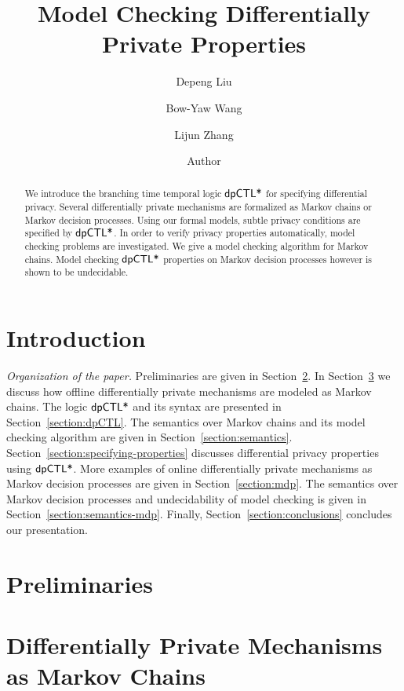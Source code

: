 \documentclass{llncs}
\title{Model Checking Differentially Private Properties}
\author{
Depeng Liu\inst{1}
\and
Bow-Yaw Wang\inst{2}
\and
Lijun Zhang\inst{1}}
\institute{
Chinese Academy of Sciences
\and
Academia Sinica
}
\author{Author}
\institute{Institute}
\begin{document}
\maketitle

\begin{abstract}
  We introduce the branching time temporal logic $\textsf{dpCTL*}$ for
  specifying differential privacy. Several differentially private
  mechanisms are formalized as Markov chains or Markov decision
  processes. Using our formal models, subtle privacy conditions
  are specified by $\textsf{dpCTL*}$. In order to verify privacy properties
  automatically, model checking problems are investigated.  We
  give a model checking algorithm for Markov chains. Model checking
  $\textsf{dpCTL*}$ properties on Markov decision processes however is
  shown to be undecidable.
\end{abstract}

\section{Introduction}
\label{section:introduction}


\noindent
\emph{Organization of the paper.}
Preliminaries are given in Section~\ref{section:preliminaries}.
In Section~\ref{section:examples} we discuss how offline differentially private mechanisms are modeled as Markov chains.
The logic $\textsf{dpCTL*}$ and its syntax are presented in Section~\ref{section:dpCTL}. The semantics over Markov chains and its model checking algorithm are given in Section~\ref{section:semantics}.
Section~\ref{section:specifying-properties} discusses differential privacy properties using $\textsf{dpCTL*}$.
More examples of online differentially private mechanisms as Markov decision processes are given in Section~\ref{section:mdp}.
The semantics over Markov decision processes and undecidability of model checking is given in Section~\ref{section:semantics-mdp}.
Finally,
Section~\ref{section:conclusions} concludes our presentation.

\section{Preliminaries}
\label{section:preliminaries}


\section{Differentially Private Mechanisms as Markov Chains}
\label{section:examples}

\end{document}
